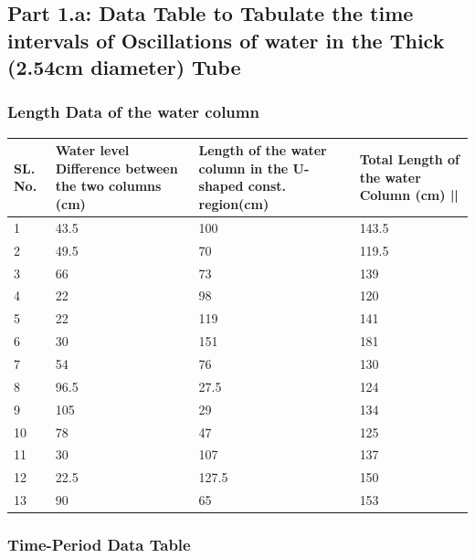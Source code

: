 \documentclass[twocolumn,11pt]{article}
\begin{document}
\subsection{Part 1.a: Data Table to Tabulate the time intervals of Oscillations of water in the Thick (2.54cm diameter) Tube}
\subsubsection{Length Data of the water column}
\begin{center}
\begin{tabular}{||p{0.5cm} | p{2cm}| p{2cm}| p{2cm} ||} 
 \hline
 SL. No. & Water level Difference between the two columns (cm) & Length of the water column in the U-shaped const. region(cm) & Total Length of the water Column (cm) ||\\ 
 \hline\hline
 1 & 43.5 & 100 & 143.5 \\ 
 \hline
 2 & 49.5 & 70 & 119.5 \\
 \hline
 3 & 66 & 73 & 139\\
 \hline
 4 & 22 &  98 & 120 \\
 \hline
 5 & 22 & 119 & 141  \\ 
 \hline
 6 & 30 & 151 & 181\\
 \hline
  7 & 54 & 76 & 130\\
 \hline
  8 & 96.5 & 27.5 & 124\\
 \hline
  9 & 105 & 29 & 134\\
 \hline
  10 & 78 & 47 & 125\\
 \hline
  11 & 30 & 107 & 137\\
 \hline
  12 & 22.5 & 127.5 & 150\\
 \hline
  13 & 90 & 65 & 153\\
 \hline
 \hline
\end{tabular}
\end{center}


\subsubsection{Time-Period Data Table}
\end{document}

